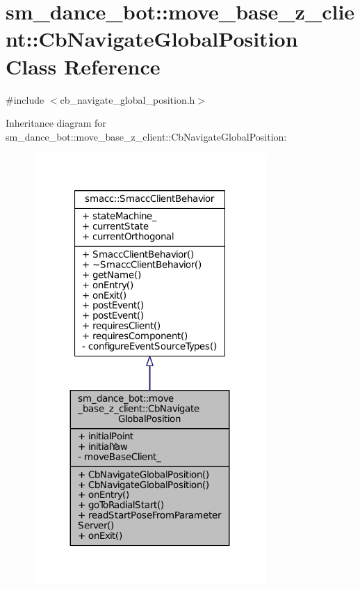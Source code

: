 \hypertarget{classsm__dance__bot_1_1move__base__z__client_1_1CbNavigateGlobalPosition}{}\section{sm\+\_\+dance\+\_\+bot\+:\+:move\+\_\+base\+\_\+z\+\_\+client\+:\+:Cb\+Navigate\+Global\+Position Class Reference}
\label{classsm__dance__bot_1_1move__base__z__client_1_1CbNavigateGlobalPosition}


{\ttfamily \#include $<$cb\+\_\+navigate\+\_\+global\+\_\+position.\+h$>$}



Inheritance diagram for sm\+\_\+dance\+\_\+bot\+:\+:move\+\_\+base\+\_\+z\+\_\+client\+:\+:Cb\+Navigate\+Global\+Position\+:
\nopagebreak
\begin{figure}[H]
\begin{center}
\leavevmode
\includegraphics[width=251pt]{classsm__dance__bot_1_1move__base__z__client_1_1CbNavigateGlobalPosition__inherit__graph}
\end{center}
\end{figure}


